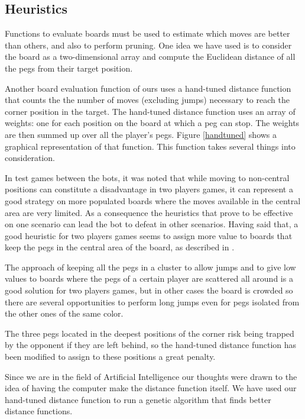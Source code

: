 



\subsection{Heuristics}

Functions to evaluate boards must be used to estimate which moves are
better than others, and also to perform pruning. One idea we have used
is to consider the board as a two-dimensional array and compute the
Euclidean distance of all the pegs from their target position.

Another board evaluation function of ours uses a hand-tuned distance
function that counts the the number of moves (excluding jumps)
necessary to reach the corner position in the target. The hand-tuned
distance function uses an array of weights: one for each position on
the board at which a peg can stop. The weights are then summed up over
all the player's pegs. Figure \ref{handtuned} shows a graphical
representation of that function. This function takes several things
into consideration.

In test games between the bots, it was noted that while moving to
non-central positions can constitute a disadvantage in two players games, it can
represent a good strategy on more populated boards where the moves available in
the central area are very limited. As a consequence the heuristics that prove to
be effective on one scenario can lead the bot to defeat in other scenarios.
Having said that, a good heuristic for two players games seems to assign more
value to boards that keep the pegs in the central area of the board, as
described in \cite{ulfhake}.

The approach of keeping all the pegs in a cluster to allow jumps and to give low
values to boards where the pegs of a certain player are scattered all around is
a good solution for two players games, but in other cases the board is crowded
so there are several opportunities to perform long jumps even for pegs isolated
from the other ones of the same color.

The three pegs located in the deepest positions of the corner risk being trapped
by the opponent if they are left behind, so the hand-tuned distance function has
been modified to assign to these positions a great penalty.

Since we are in the field of Artificial Intelligence our thoughts
were drawn to the idea of having the computer make the distance
function itself. We have used our hand-tuned distance function to run
a genetic algorithm that finds better distance functions.


